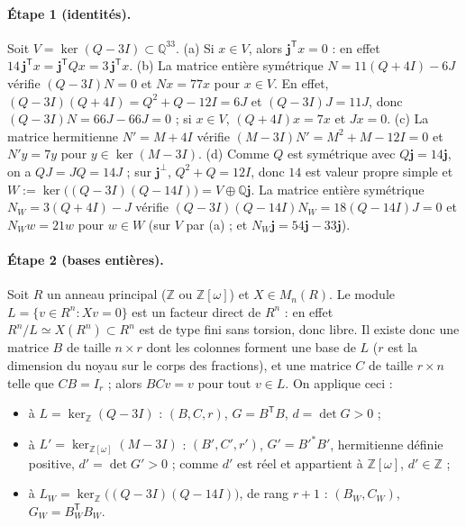 \documentclass[11pt,a4paper]{article}
\theoremstyle{remark}
\newcommand{\Z}{\mathbb{Z}}
\newcommand{\Q}{\mathbb{Q}}
\newcommand{\one}{\mathbf{j}}
\begin{document}
\paragraph{Étape 1 (identités).}
Soit $V=\ker(Q-3I)\subset\Q^{33}$.
(a) Si $x\in V$, alors $\one^{\mathsf T}x=0$ : en effet $14\,\one^{\mathsf T}x=\one^{\mathsf T}Qx=3\,\one^{\mathsf T}x$.
(b) La matrice entière symétrique $N=11(Q+4I)-6J$ vérifie $(Q-3I)N=0$ et $Nx=77x$ pour $x\in V$.
En effet, $(Q-3I)(Q+4I)=Q^2+Q-12I=6J$ et $(Q-3I)J=11J$, donc $(Q-3I)N=66J-66J=0$ ; si $x\in V$, $(Q+4I)x=7x$ et $Jx=0$.
(c) La matrice hermitienne $N'=M+4I$ vérifie $(M-3I)N'=M^2+M-12I=0$ et $N'y=7y$ pour $y\in\ker(M-3I)$.
(d) Comme $Q$ est symétrique avec $Q\one=14\one$, on a $QJ=JQ=14J$ ; sur $\one^\perp$, $Q^2+Q=12I$, donc $14$ est valeur propre
simple et $W:=\ker\bigl((Q-3I)(Q-14I)\bigr)=V\oplus\Q\one$. La matrice entière symétrique $N_W=3(Q+4I)-J$ vérifie
$(Q-3I)(Q-14I)N_W=18(Q-14I)J=0$ et $N_Ww=21w$ pour $w\in W$ (sur $V$ par (a) ; et $N_W\one=54\one-33\one$).

\paragraph{Étape 2 (bases entières).}
Soit $R$ un anneau principal ($\Z$ ou $\Z[\omega]$) et $X\in M_n(R)$. Le module $L=\{v\in R^n : Xv=0\}$ est un facteur direct de
$R^n$ : en effet $R^n/L\simeq X(R^n)\subset R^n$ est de type fini sans torsion, donc libre. Il existe donc une matrice $B$ de taille
$n\times r$ dont les colonnes forment une base de $L$ ($r$ est la dimension du noyau sur le corps des fractions), et une matrice
$C$ de taille $r\times n$ telle que $CB=I_r$ ; alors $BCv=v$ pour tout $v\in L$. On applique ceci :
\begin{itemize}[nosep]
\item à $L=\ker_\Z(Q-3I)$ : $(B,C,r)$, $G=B^{\mathsf T}B$, $d=\det G>0$ ;
\item à $L'=\ker_{\Z[\omega]}(M-3I)$ : $(B',C',r')$, $G'=B'^*B'$, hermitienne définie positive, $d'=\det G'>0$ ;
comme $d'$ est réel et appartient à $\Z[\omega]$, $d'\in\Z$ ;
\item à $L_W=\ker_\Z\bigl((Q-3I)(Q-14I)\bigr)$, de rang $r+1$ : $(B_W,C_W)$, $G_W=B_W^{\mathsf T}B_W$.
\end{itemize}
\end{document}
